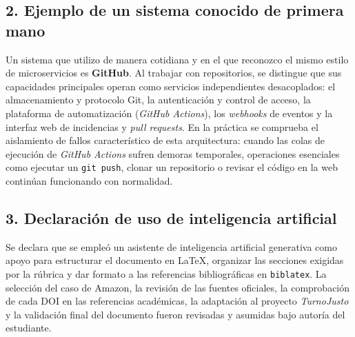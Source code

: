 \documentclass[10pt,letterpaper]{article}
\begin{document}
\subsection*{2. Ejemplo de un sistema conocido de primera mano}
Un sistema que utilizo de manera cotidiana y en el que reconozco el mismo estilo de microservicios es \textbf{GitHub}. Al trabajar con repositorios, se distingue que sus capacidades principales operan como servicios independientes desacoplados: el almacenamiento y protocolo Git, la autenticación y control de acceso, la plataforma de automatización (\emph{GitHub Actions}), los \emph{webhooks} de eventos y la interfaz web de incidencias y \emph{pull requests}. En la práctica se comprueba el aislamiento de fallos característico de esta arquitectura: cuando las colas de ejecución de \emph{GitHub Actions} sufren demoras temporales, operaciones esenciales como ejecutar un \texttt{git push}, clonar un repositorio o revisar el código en la web continúan funcionando con normalidad.

\subsection*{3. Declaración de uso de inteligencia artificial}
Se declara que se empleó un asistente de inteligencia artificial generativa como apoyo para estructurar el documento en \LaTeX, organizar las secciones exigidas por la rúbrica y dar formato a las referencias bibliográficas en \texttt{biblatex}. La selección del caso de Amazon, la revisión de las fuentes oficiales, la comprobación de cada DOI en las referencias académicas, la adaptación al proyecto \emph{TurnoJusto} y la validación final del documento fueron revisadas y asumidas bajo autoría del estudiante.

\clearpage

\printbibliography[title={Referencias}]
\end{document}

